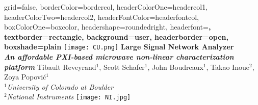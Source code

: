 \documentclass[a0paper,portrait]{baposter}
\begin{document}

\begin{poster}{
grid=false,
borderColor=bordercol, %
headerColorOne=headercol1, %
headerColorTwo=headercol2, %
headerFontColor=headerfontcol, %
boxColorOne=boxcolor, %
headershape=roundedright, %
headerfont=\Large\sf\bf, %
textborder=rectangle,
background=user,
headerborder=open, %
boxshade=plain
}
{\texttt{[image: CU.png]}}
%
%
{ \bf  \huge {Large Signal Network Analyzer} \\  \Large \it An affordable PXI-based microwave non-linear characterization platform} %
{\vspace{0.3em} \smaller Tibault Reveyrand$^1$, Scott Schafer$^1$, John Boudreaux$^1$, Takao Inoue$^2$, Zoya Popovi\'c$^1$   \\  %
  
\smaller $^1$\it {University of Colorado at Boulder} \\ $^2$\it{National Instruments} } %
{\texttt{[image: NI.jpg]}} %


\end{poster}
\end{document}
